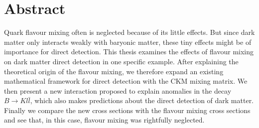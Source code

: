 \thispagestyle{plain}
\section*{Abstract}
Quark flavour mixing often is neglected because of its little effects. But since dark matter only interacts weakly with baryonic matter, these tiny effects might be of importance for direct detection. This thesis examines the effects of flavour mixing on dark matter direct detection in one specific example. After explaining the theoretical origin of the flavour mixing, we therefore expand an existing mathematical framework for direct detection with the CKM mixing matrix. We then present a new interaction proposed to explain anomalies in the decay $B\rightarrow Kl\bar{l}$, which also makes predictions about the direct detection of dark matter. Finally we compare the new cross sections with the flavour mixing cross sections and see that, in this case, flavour mixing was rightfully neglected.
